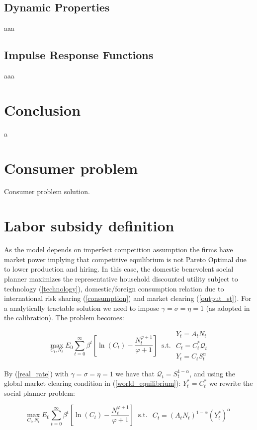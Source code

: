 \documentclass{article}
\begin{document}
\subsection{Dynamic Properties}
aaa

\subsection{Impulse Response Functions}
aaa

\section{Conclusion}
a



\appendix
\section{Consumer problem}
Consumer problem solution.

\section{Labor subsidy definition}
As the model depends on imperfect competition assumption the firms have market power implying that competitive equilibrium is not Pareto Optimal due to lower production and hiring. In this case, the domestic benevolent social planner maximizes the representative household discounted utility subject to technology (\ref{technology}), domestic/foreign consumption relation due to international risk sharing (\ref{consumption}) and market clearing (\ref{output_st}). For a analytically tractable solution we need to impose $\gamma = \sigma = \eta = 1$ (as adopted in the calibration). The problem becomes:

$$\max_{C_t, N_t} E_0 \sum^\infty_{t=0} \beta^t \left[\ln(C_t) - \frac{N_t^{\varphi+1}}{\varphi+1} \right] \ \textrm{ s.t. } \begin{matrix}
    Y_t = A_t N_t\\
    C_t = C_t^* \mathcal Q_{t}\\
    Y_t = C_t S_t^\alpha
\end{matrix}$$

By (\ref{real_rate}) with $\gamma = \sigma = \eta = 1$ we have that $\mathcal{Q}_t = S_t^{1-\alpha}$, and using the global market clearing condition in (\ref{world_equilibrium}): $Y_t^* = C_t^*$ we rewrite the social planner problem:

$$\max_{C_t, N_t} E_0 \sum^\infty_{t=0} \beta^t \left[\ln(C_t) - \frac{N_t^{\varphi+1}}{\varphi+1} \right] \ \textrm{ s.t. } \begin{matrix}
    C_t = (A_t N_t)^{1-\alpha}(Y_t^*)^\alpha
\end{matrix}$$
\end{document}
